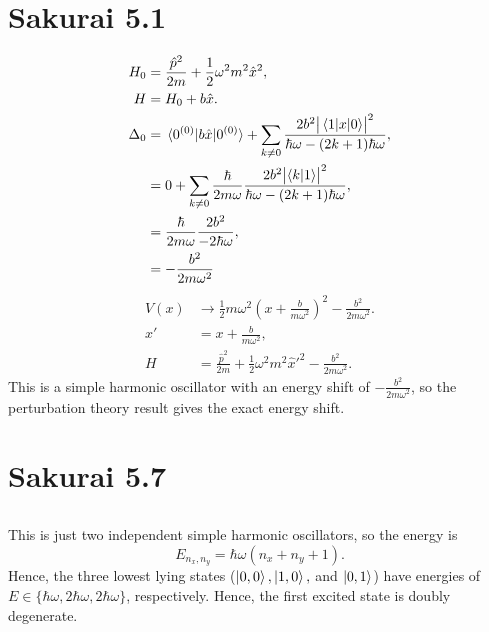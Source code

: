 \documentclass[
a4paper,
10pt,
twoside,
]{article}
\begin{document}
\titleinf
\maketitle
\startmcols

\section{Sakurai 5.1}\label{sec: I}

\begin{align}
	H_0 &= \frac{\hat{p}^2}{2m} + \frac{1}{2}\omega^2m^2\hat{x}^2,\\
	H &= H_0 + b\hat{x}.\\
	\Delta_0 &= \mel*{0^{(0)}}{b\hat{x}}{0^{(0)}} + \sum_{k \neq 0} \frac{2b^2 \abs{\mel*{1}{x}{0}}^2}{\hbar\omega - (2k+1)\hbar\omega},\\
	&= 0 + \sum_{k \neq 0} \frac{\hbar}{2m\omega}\frac{2b^2 \abs{\ip{k}{1}}^2}{\hbar\omega - (2k+1)\hbar\omega},\\
	&= \frac{\hbar}{2m\omega}\frac{2b^2}{-2\hbar\omega},\\
	&= -\frac{b^2}{2m\omega^2}
\end{align}
\begin{align}
	V(x) &\rightarrow \frac{1}{2}m \omega^2\left(x+\frac{b}{m\omega^2}\right)^2-\frac{b^2}{2m\omega^2}.\\
	x' &= x+\frac{b}{m\omega^2},\\
	H &= \frac{\hat{p}^2}{2m} + \frac{1}{2}\omega^2m^2\hat{x}'^2-\frac{b^2}{2m\omega^2}.
\end{align}
This is a simple harmonic oscillator with an energy shift of $-\frac{b^2}{2m\omega^2}$, so the perturbation theory result gives the exact energy shift.

\section{Sakurai 5.7}\label{sec: II}

\subsection{}\label{subsec: IIa}

This is just two independent simple harmonic oscillators, so the energy is
\begin{equation}
	E_{n_x,n_y} = \hbar\omega\left(n_x+n_y+1\right).
\end{equation}
Hence, the three lowest lying states ($\ket{0,0},\ket{1,0},$ and $\ket{0,1}$) have energies of $E \in \{ \hbar\omega, 2\hbar\omega, 2\hbar\omega \}$, respectively.
Hence, the first excited state is doubly degenerate.
\end{document}
